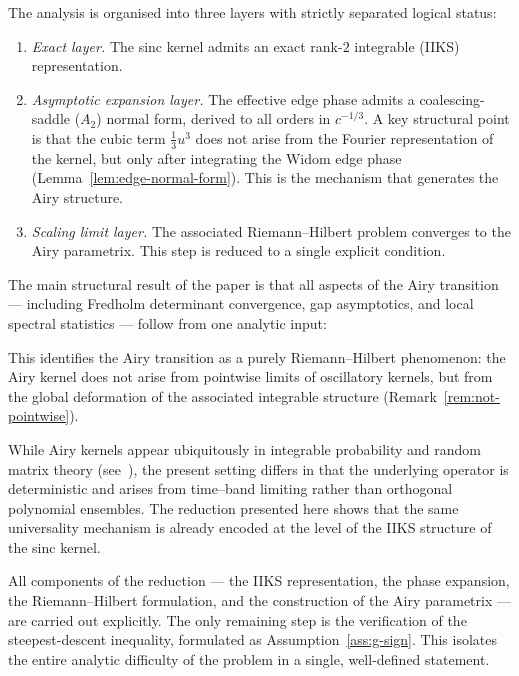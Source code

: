 \documentclass[12pt,a4paper]{amsart}
\theoremstyle{definition}
\theoremstyle{remark}
\begin{document}
The analysis is organised into three layers with strictly separated
logical status:
\begin{enumerate}[label=(\roman*)]
\item \emph{Exact layer.}
The sinc kernel admits an exact rank-$2$ integrable (IIKS) representation.

\item \emph{Asymptotic expansion layer.}
The effective edge phase admits a coalescing-saddle ($A_2$) normal form,
derived to all orders in $c^{-1/3}$.
A key structural point is that the cubic term $\frac{1}{3}u^3$ does not
arise from the Fourier representation of the kernel, but only after
integrating the Widom edge phase (Lemma~\ref{lem:edge-normal-form}).
This is the mechanism that generates the Airy structure.

\item \emph{Scaling limit layer.}
The associated Riemann--Hilbert problem converges to the Airy
parametrix. This step is reduced to a single explicit condition.
\end{enumerate}

The main structural result of the paper is that all aspects of the
Airy transition --- including Fredholm determinant convergence,
gap asymptotics, and local spectral statistics --- follow from
one analytic input:
\begin{center}
\end{center}

This identifies the Airy transition as a purely Riemann--Hilbert
phenomenon: the Airy kernel does not arise from pointwise limits
of oscillatory kernels, but from the global deformation of the
associated integrable structure (Remark~\ref{rem:not-pointwise}).

While Airy kernels appear ubiquitously in integrable probability
and random matrix theory (see~\cite{TraWid1994,Deift1999}),
the present setting differs in that the underlying operator is
deterministic and arises from time--band limiting rather than
orthogonal polynomial ensembles.
The reduction presented here shows that the same universality
mechanism is already encoded at the level of the IIKS structure
of the sinc kernel.

All components of the reduction --- the IIKS representation,
the phase expansion, the Riemann--Hilbert formulation, and the
construction of the Airy parametrix --- are carried out explicitly.
The only remaining step is the verification of the steepest-descent
inequality, formulated as Assumption~\ref{ass:g-sign}.
This isolates the entire analytic difficulty of the problem in a
single, well-defined statement.
\end{document}
